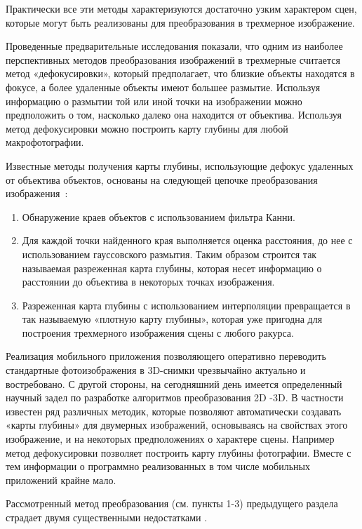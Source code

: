 Практически все эти методы характеризуются достаточно узким характером сцен, которые могут быть реализованы для преобразования в трехмерное изображение. 

Проведенные предварительные исследования показали, что одним из наиболее перспективных методов преобразования изображений в трехмерные считается метод «дефокусировки», который предполагает, что близкие объекты находятся в фокусе, а более удаленные объекты имеют большее размытие. Используя информацию о размытии той или иной точки на изображении можно предположить о том, насколько далеко она находится от объектива. Используя метод дефокусировки можно построить карту глубины для любой макрофотографии. 

Известные методы получения карты глубины, использующие дефокус удаленных от объектива объектов, основаны на следующей цепочке преобразования изображения~\cite{depthMap1}:

\begin{enumerate} 
	\item Обнаружение краев объектов с использованием фильтра Канни.
	\item Для каждой точки найденного края выполняется оценка расстояния, до нее с использованием гауссовского размытия. Таким образом строится так называемая разреженная карта глубины, которая несет информацию о расстоянии до объектива в некоторых точках изображения. 
	\item Разреженная карта глубины с использованием интерполяции превращается в так называемую «плотную карту глубины», которая уже пригодна для построения трехмерного изображения сцены с любого ракурса. 
\end{enumerate}

Реализация мобильного приложения позволяющего оперативно переводить стандартные фотоизображения в 3D-снимки чрезвычайно актуально и востребовано. С другой стороны, на сегодняшний день имеется определенный научный задел по разработке алгоритмов преобразования 2D -3D. В частности известен ряд различных методик, которые позволяют автоматически создавать «карты глубины» для двумерных изображений, основываясь на свойствах этого изображение, и на некоторых предположениях о характере сцены. Например метод дефокусировки позволяет построить карту глубины фотографии. Вместе с тем информации о программно реализованных в том числе мобильных приложений крайне мало. 

Рассмотренный метод преобразования (см. пункты 1-3) предыдущего раздела страдает двумя существенными недостатками \cite{depthMap2}.

